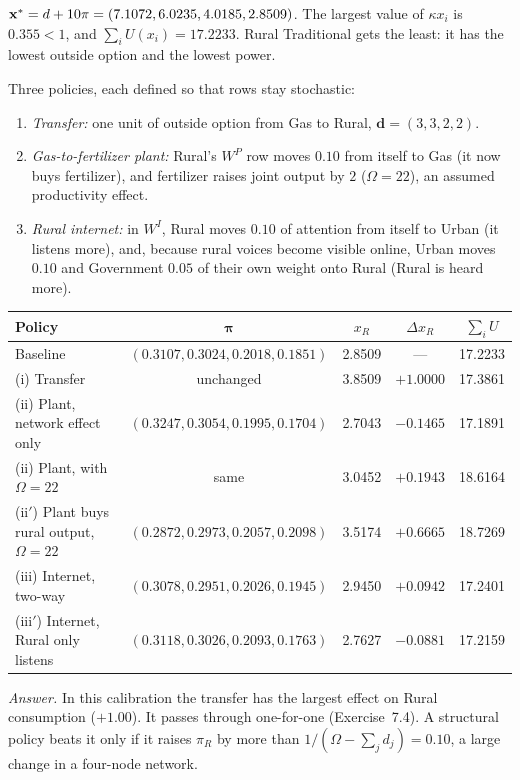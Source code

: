 \documentclass[../solutions_manual.tex]{subfiles}
\begin{document}
 $\mathbf{x}^* = d + 10\pi = (7.1072, 6.0235, 4.0185, 2.8509)$. The largest value of $\kappa x_i$ is $0.355 < 1$, and $\sum_iU(x_i) = 17.2233$. Rural Traditional gets the least: it has the lowest outside option and the lowest power.

 Three policies, each defined so that rows stay stochastic:
\begin{enumerate}
\item[(i)] \emph{Transfer:} one unit of outside option from Gas to Rural, $\boldsymbol{d} = (3, 3, 2, 2)$.
\item[(ii)] \emph{Gas-to-fertilizer plant:} Rural's $W^P$ row moves $0.10$ from itself to Gas (it now buys fertilizer), and fertilizer raises joint output by $2$ ($\Omega = 22$), an assumed productivity effect.
\item[(iii)] \emph{Rural internet:} in $W^I$, Rural moves $0.10$ of attention from itself to Urban (it listens more), and, because rural voices become visible online, Urban moves $0.10$ and Government $0.05$ of their own weight onto Rural (Rural is heard more).
\end{enumerate}
\begin{center}
\footnotesize
\setlength{\tabcolsep}{3pt}
\begin{tabular}{lcccc}
\toprule
Policy & $\boldsymbol{\pi}$ & $x_R$ & $\Delta x_R$ & $\sum_iU$ \\
\midrule
Baseline & $(0.3107, 0.3024, 0.2018, 0.1851)$ & 2.8509 & --- & 17.2233 \\
(i) Transfer & unchanged & 3.8509 & $+1.0000$ & 17.3861 \\
(ii) Plant, network effect only & $(0.3247, 0.3054, 0.1995, 0.1704)$ & 2.7043 & $-0.1465$ & 17.1891 \\
(ii) Plant, with $\Omega = 22$ & same & 3.0452 & $+0.1943$ & 18.6164 \\
(ii$'$) Plant buys rural output, $\Omega = 22$ & $(0.2872, 0.2973, 0.2057, 0.2098)$ & 3.5174 & $+0.6665$ & 18.7269 \\
(iii) Internet, two-way & $(0.3078, 0.2951, 0.2026, 0.1945)$ & 2.9450 & $+0.0942$ & 17.2401 \\
(iii$'$) Internet, Rural only listens & $(0.3118, 0.3026, 0.2093, 0.1763)$ & 2.7627 & $-0.0881$ & 17.2159 \\
\bottomrule
\end{tabular}
\end{center}
\emph{Answer.} In this calibration the transfer has the largest effect on Rural consumption ($+1.00$). It passes through one-for-one (Exercise~7.4). A structural policy beats it only if it raises $\pi_R$ by more than $1/(\Omega - \sum_jd_j) = 0.10$, a large change in a four-node network.
\end{document}
